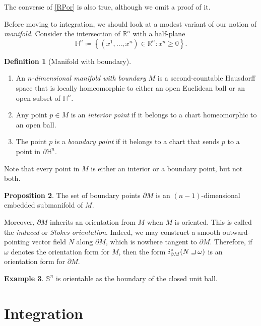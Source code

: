\documentclass[10pt,letterpaper,cm]{nupset}
\theoremstyle{definition}
\newtheorem{definition}{Definition}[subsection]
\newtheorem{exmp}[definition]{Example}
\theoremstyle{theorem}
\newtheorem{prop}[definition]{Proposition}
\theoremstyle{remark}
\renewcommand{\H}{\mathbb H}
\newcommand{\R}{\mathbb R}
\renewcommand{\S}{\mathbb S}
\newcommand{\1}{\mathbf{1}}
\newcommand{\0}{\vec 0}
\newcommand{\intprodl}{%
    \mathbin{\scalebox{1.5}{$\lrcorner$}}%
}
\begin{document}
The converse of \cref{RPor} is also true, although we omit a proof of it.

\bigskip



Before moving to integration, we should look at a modest variant of our notion of \textit{manifold}. Consider the intersection of $\R^n$ with a half-plane 
$$\H^n\coloneqq  \left\{\left(x^1, \ldots, x^n\right) \in \R^n : x^n \geq 0\right\}.$$


\begin{definition}[Manifold with boundary] $ $
\begin{enumerate}
\item An \textit{$n$-dimensional manifold with boundary} $M$ is a second-countable Hausdorff space that is locally homeomorphic to either an open Euclidean ball or an open subset of $\H^n$. 
\item Any point $p\in M$ is an \textit{interior point} if it belongs to a chart homeomorphic to an open ball. 
\item The  point $p$ is  a \textit{boundary point} if it belongs to a chart that sends $p$ to a point in $\partial{\H^n}$.
\end{enumerate}
\end{definition}


Note that every point in $M$ is either an interior or a boundary point, but not both.


\begin{prop}
The set of boundary points $\partial{M}$ is an $(n-1)$-dimensional embedded submanifold of $M$.
\end{prop}


Moreover, $\partial{M}$ inherits an orientation from $M$ when $M$ is oriented. This is called the \textit{induced} or \textit{Stokes orientation}. Indeed, we may construct a smooth  outward-pointing vector field $N$ along $\partial{M}$, which is nowhere tangent to $\partial{M}$. Therefore,  if $\omega$ denotes the orientation form for $M$, then the form $i^{\ast}_{\partial{M}}(N \intprodl \omega)$ is an orientation form for $\partial{M}$.


\begin{exmp}
$\S^n$ is orientable as the boundary of the closed unit ball.
\end{exmp}

\section{Integration}
\end{document}
